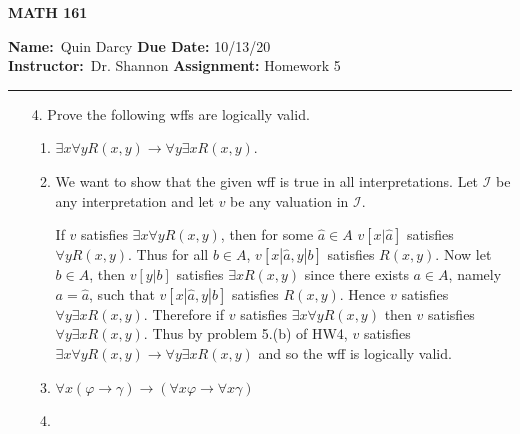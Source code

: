 \documentclass[12pt]{article}
\makeatletter
\theoremstyle{definition}
\theoremstyle{remark}
\renewenvironment{proof}[1][\proofname]{\par
  \pushQED{\qed}%
  \normalfont \topsep6\p@\@plus6\p@\relax
  \list{}{\leftmargin=0mm
          \rightmargin=4mm
          \settowidth{\itemindent}{\itshape#1}%
          \labelwidth=\itemindent
          \parsep=0pt \listparindent=\parindent 
  }
  \item[\hskip\labelsep
        \itshape
    #1\@addpunct{.}]\ignorespaces
}{%
  \popQED\endlist\@endpefalse
}
\let\oldproofname=\proofname
\renewcommand{\proofname}{\bf{\textit{\oldproofname}}}
\makeatother
\begin{document}
\thispagestyle{empty}\hline

\begin{center}
	\vspace{.4cm} {\textbf { \large MATH 161}}
\end{center}
{\textbf{Name:}\ Quin Darcy \hspace{\fill} \textbf{Due Date:} 10/13/20   \\
{ \textbf{Instructor:}}\ Dr. Shannon \hspace{\fill} \textbf{Assignment:} Homework 5 \\ \hrule}

\justifying
    \begin{enumerate}[leftmargin=*]
        \item[4.] Prove the following wffs are logically valid.\hfill\par
            \begin{enumerate}
                \item $\exists x\forall yR(x,y)\rightarrow\forall y\exists xR(x,y)$.
                    \begin{proof}
                        We want to show that the given wff is true in all interpretations. Let $\mathcal{I}$ be any interpretation and let $v$ be any valuation in $\mathcal{I}$.\par\hspace{4mm} If $v$ satisfies $\exists x\forall y R(x,y)$, then for some $\hat{a}\in A$ $v[x|\hat{a}]$ satisfies $\forall yR(x,y)$. Thus for all $b\in A$, $v[x|\hat{a},y|b]$ satisfies $R(x,y)$. Now let $b\in A$, then $v[y|b]$ satisfies $\exists x R(x,y)$ since there exists $a\in A$, namely $a=\hat{a}$, such that $v[x|\hat{a},y|b]$ satisfies $R(x,y)$. Hence $v$ satisfies $\forall y\exists x R(x,y)$. Therefore if $v$ satisfies $\exists x\forall y R(x,y)$ then $v$ satisfies $\forall y\exists x R(x,y)$. Thus by problem 5.(b) of HW4, $v$ satisfies $\exists x\forall y R(x,y)\rightarrow\forall y\exists x R(x,y)$ and so the wff is logically valid.
                    \end{proof}
                \item $\forall x(\varphi\rightarrow\gamma)\rightarrow(\forall x\varphi\rightarrow\forall x\gamma)$
                    \begin{proof}

\end{proof}
\end{enumerate}
\end{enumerate}
\end{document}
